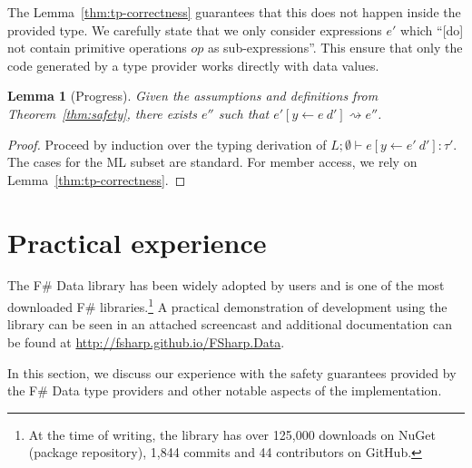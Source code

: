 \documentclass[10pt]{sigplanconf}
\newcommand{\reduce}{\rightsquigarrow}
\newtheorem{lemma}[theorem]{Lemma}
\begin{document}
The Lemma~\ref{thm:tp-correctness} guarantees that this does not happen inside the provided type.
We carefully state that we only consider expressions $e'$ which
``[do] not contain primitive operations $op$ as sub-expressions''. This ensure that only
the code generated by a type provider works directly with data values.

\begin{lemma}[Progress]
\label{thm:rs-progress}
Given the assumptions and definitions from Theorem~\ref{thm:safety}, there exists $e''$ such that
$e'[y\leftarrow e~d'] \reduce e''$.
\end{lemma}
\begin{proof}
Proceed by induction over the typing derivation of $L; \emptyset \vdash e[y\leftarrow e'~d'] : \tau'$.
The cases for the ML subset are standard. For member access, we rely on Lemma~\ref{thm:tp-correctness}.
\end{proof}



%
%

\section{Practical experience}
\label{sec:impl}

The F\# Data library has been widely adopted by users and is one of the most downloaded
F\# libraries.\footnote{At the time of writing, the library has over 125,000 downloads on NuGet
(package repository), 1,844 commits and 44 contributors on GitHub.} A practical demonstration of
development using the library can be seen in an attached screencast and additional documentation can be
found at \url{http://fsharp.github.io/FSharp.Data}.

In this section, we discuss our experience with the safety guarantees provided by the
F\# Data type providers and other notable aspects of the implementation.
\end{document}
